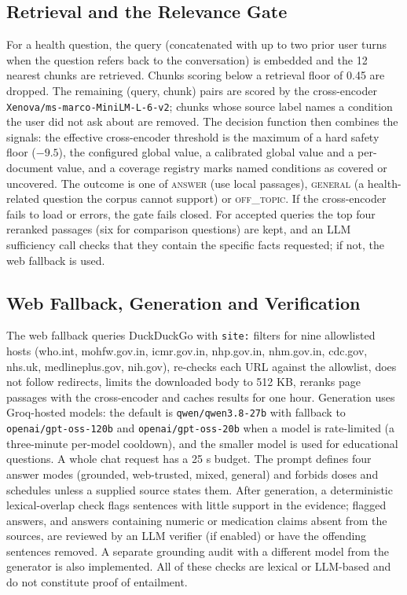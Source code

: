 \documentclass[10pt,a4paper]{article}
\newcommand{\code}[1]{\texttt{\small #1}}
\begin{document}
\subsection{Retrieval and the Relevance Gate}\label{sec:gate}
For a health question, the query (concatenated with up to two prior user turns when the question refers back to the conversation) is embedded and the 12 nearest chunks are retrieved. Chunks scoring below a retrieval floor of 0.45 are dropped. The remaining (query, chunk) pairs are scored by the cross-encoder \code{Xenova/ms-marco-MiniLM-L-6-v2}; chunks whose source label names a condition the user did not ask about are removed. The decision function then combines the signals: the effective cross-encoder threshold is the maximum of a hard safety floor ($-9.5$), the configured global value, a calibrated global value and a per-document value, and a coverage registry marks named conditions as covered or uncovered. The outcome is one of \textsc{answer} (use local passages), \textsc{general} (a health-related question the corpus cannot support) or \textsc{off\_topic}. If the cross-encoder fails to load or errors, the gate fails closed. For accepted queries the top four reranked passages (six for comparison questions) are kept, and an LLM sufficiency call checks that they contain the specific facts requested; if not, the web fallback is used.

\subsection{Web Fallback, Generation and Verification}
The web fallback queries DuckDuckGo with \code{site:} filters for nine allowlisted hosts (who.int, mohfw.gov.in, icmr.gov.in, nhp.gov.in, nhm.gov.in, cdc.gov, nhs.uk, medlineplus.gov, nih.gov), re-checks each URL against the allowlist, does not follow redirects, limits the downloaded body to 512 KB, reranks page passages with the cross-encoder and caches results for one hour. Generation uses Groq-hosted models: the default is \code{qwen/qwen3.8-27b} with fallback to \code{openai/gpt-oss-120b} and \code{openai/gpt-oss-20b} when a model is rate-limited (a three-minute per-model cooldown), and the smaller model is used for educational questions. A whole chat request has a 25 s budget. The prompt defines four answer modes (grounded, web-trusted, mixed, general) and forbids doses and schedules unless a supplied source states them. After generation, a deterministic lexical-overlap check flags sentences with little support in the evidence; flagged answers, and answers containing numeric or medication claims absent from the sources, are reviewed by an LLM verifier (if enabled) or have the offending sentences removed. A separate grounding audit with a different model from the generator is also implemented. All of these checks are lexical or LLM-based and do not constitute proof of entailment.
\end{document}
